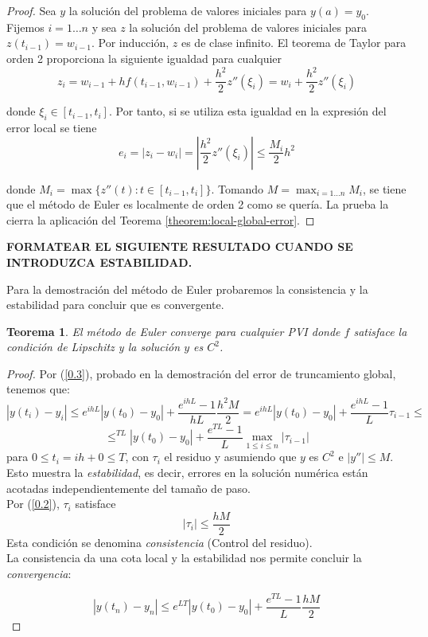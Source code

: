 \documentclass{article}
\theoremstyle{theorem-style}  %
\newtheorem{theorem}{Teorema}[section]  %
\theoremstyle{definition}
\theoremstyle{example-style}
\begin{document}
	\begin{proof}
		Sea $y$ la solución del problema de valores iniciales para $y(a) = y_0$. Fijemos $i = 1 \ldots n$ y sea $z$ la solución del problema de valores iniciales para $z(t_{i-1}) = w_{i-1}$. Por inducción, $z$ es de clase infinito. El teorema de Taylor para orden 2 proporciona la siguiente igualdad para cualquier 
		\begin{equation}
			z_i= w_{i-1} + h f(t_{i-1}, w_{i-1}) + \frac{h^2}{2} z''(\xi_i) = w_i + \frac{h^2}{2} z''(\xi_i)
		\end{equation}

		donde $\xi_i \in [t_{i-1}, t_i]$. Por tanto, si se utiliza esta igualdad en la expresión del error local se tiene
		\begin{equation}
			e_i = |z_i - w_i| = \left|\frac{h^2}{2} z''(\xi_i)\right| \le \frac{M_i}{2} h^2
		\end{equation}

		donde $M_i = \max\{z''(t) : t \in [t_{i-1}, t_i]\}$. Tomando $M = \max_{i = 1 \ldots n} M_i$, se tiene que el método de Euler es localmente de orden 2 como se quería. La prueba la cierra la aplicación del Teorema \ref{theorem:local-global-error}.
	\end{proof}
	
	
	\textbf{FORMATEAR EL SIGUIENTE RESULTADO CUANDO SE INTRODUZCA ESTABILIDAD.}

	Para la demostración del método de Euler probaremos la consistencia y la estabilidad para concluir que es convergente.
	
	\begin{theorem}
		El método de Euler converge para cualquier PVI donde $f$ satisface la condición de Lipschitz y la solución $y$ es $C^2$.
	\end{theorem}
	
	\begin{proof}
		Por (\ref{0.3}), probado en la demostración del error de truncamiento global, tenemos que:
		$$|y(t_i)-y_i| \le e^{ihL}|y(t_0)-y_0|+\frac{e^{ihL}-1}{hL}\frac{h^2M}{2} = e^{ihL}|y(t_0)-y_0|+\frac{e^{ihL}-1}{L}\tau_{i-1} \le $$ $$ \le^{TL}|y(t_0)-y_0|+\frac{e^{TL}-1}{L}\max_{1 \le i \le n} |\tau_{i-1}|$$
		para $0 \le t_i=ih+0 \le T$, con $\tau_i$ el residuo y asumiendo que $y$ es $C^2$ e $|y''| \le M$. Esto muestra la \textit{estabilidad}, es decir, errores en la solución numérica están acotadas independientemente del tamaño de paso.\\
		
		Por (\ref{0.2}), $\tau_i$ satisface
		$$|\tau_i|\le \frac{hM}{2}$$
		Esta condición se denomina \textit{consistencia} (Control del residuo).\\
		
		La consistencia da una cota local y la estabilidad nos permite concluir la \textit{convergencia}:
		
		$$|y(t_n)-y_n| \le e^{LT}|y(t_0)-y_0|+\frac{e^{TL}-1}{L}\frac{hM}{2}$$ 
	\end{proof}
	
\end{document}
